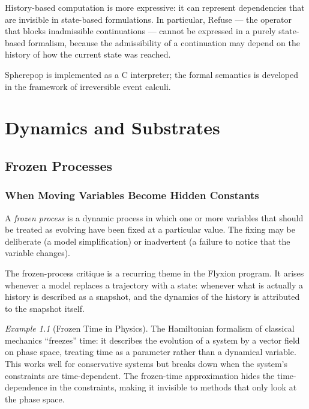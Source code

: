 \documentclass[12pt,a4paper]{book}
\theoremstyle{remark}
\newtheorem{example}{Example}[chapter]
\theoremstyle{definition}
\begin{document}
History-based computation is more expressive: it can represent
dependencies that are invisible in state-based formulations. In
particular, Refuse --- the operator that blocks inadmissible continuations
--- cannot be expressed in a purely state-based formalism, because the
admissibility of a continuation may depend on the history of how the
current state was reached.

Spherepop is implemented as a C interpreter; the formal semantics is
developed in the framework of irreversible event calculi.

\part{Dynamics and Substrates}

\chapter{Frozen Processes}

\section{When Moving Variables Become Hidden Constants}

A \emph{frozen process} is a dynamic process in which one or more
variables that should be treated as evolving have been fixed at a
particular value. The fixing may be deliberate (a model simplification)
or inadvertent (a failure to notice that the variable changes).

The frozen-process critique is a recurring theme in the Flyxion program.
It arises whenever a model replaces a trajectory with a state: whenever
what is actually a history is described as a snapshot, and the dynamics
of the history is attributed to the snapshot itself.

\begin{example}[Frozen Time in Physics]
The Hamiltonian formalism of classical mechanics ``freezes'' time: it
describes the evolution of a system by a vector field on phase space,
treating time as a parameter rather than a dynamical variable. This
works well for conservative systems but breaks down when the system's
constraints are time-dependent. The frozen-time approximation hides the
time-dependence in the constraints, making it invisible to methods that
only look at the phase space.
\end{example}
\end{document}
